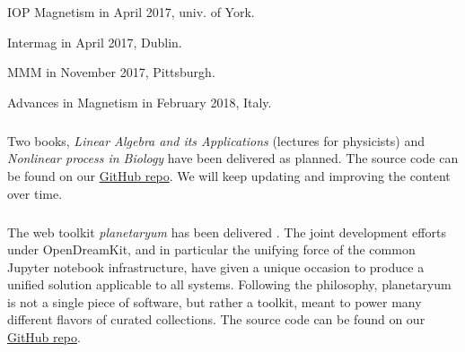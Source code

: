 \begin{compactitem}
\item IOP Magnetism in April 2017, univ. of York.
\item Intermag in April 2017, Dublin.
\item MMM in November 2017, Pittsburgh.
\item Advances in Magnetism in February 2018, Italy.
\end{compactitem}

\subparagraph{}

Two books, \emph{Linear Algebra and its Applications} (lectures for physicists) and \emph{Nonlinear process in Biology}  have been delivered as planned. The source code can be found on our \href{https://github.com/OpenDreamKit/iODKbook2}{GitHub repo}. We will keep updating and improving the content over time.


\subparagraph{}

The web toolkit \textit{planetaryum} has been delivered . The joint development efforts under OpenDreamKit, and in particular
the unifying force of the common Jupyter notebook infrastructure, have given a unique occasion
to produce a unified solution applicable to all systems. Following the \ODK philosophy, planetaryum is not a single piece of software, but
rather a toolkit, meant to power many different flavors of curated collections. The source code can be found on our \href{https://github.com/OpenDreamKit/planetaryum}{GitHub repo}.



